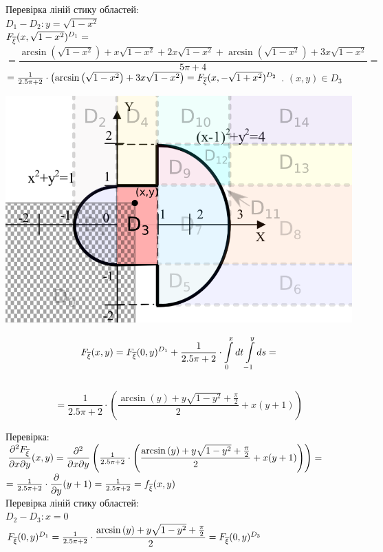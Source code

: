 \documentclass[14pt,a4paper]{scrartcl}
\theoremstyle{definition}
\theoremstyle{remark}
\theoremstyle{definition}
\theoremstyle{definition}
\begin{document}
Перевірка ліній стику областей:\\
$D_1 - D_2: y = \sqrt{1- x^2}$\\
$ F_{\overline{\xi}} (x,\sqrt{1- x^2})^{D_1} = $\\
$=\dfrac{\arcsin\left(\sqrt{1-x^2}\right)+x\sqrt{1-x^2}+2x\sqrt{1-x^2}+\arcsin\left(\sqrt{1-x^2}\right)+3x\sqrt{1-x^2}}{5\pi + 4} =$
\\$= \frac{1}{2.5\pi + 2} \cdot \left( \arcsin\left(\sqrt{1-x^2}\right)+3x\sqrt{1-x^2} \right)  =F_{\overline{\xi}} (x,-\sqrt{1+x^2})^{D_2}$
. $(x,y) \in D_3$
\begin{center} \includegraphics[scale=0.4]{assets/zone43.png} \end{center}
$$
F_{\overline{\xi}} (x,y) =  F_{\overline{\xi}} (0,y)^{D_1}+ \frac{1}{2.5\pi + 2} \cdot  \int\limits_{0}^{ x}{dt  \int\limits_{-1}^{y }{ds}} =$$\\$$= \frac{1}{2.5\pi + 2} \cdot \left( \dfrac{\arcsin\left(y\right)+y\sqrt{1-y^2} + \frac{\pi}{2} }{2}+ x(y+1)\right)
$$

Перевірка:\\
$\dfrac{\partial^2 F_{\overline{\xi}}}{\partial x \partial y}(x,y) = \dfrac{\partial^2}{\partial x \partial y} \left(\frac{1}{2.5\pi + 2} \cdot \left( \dfrac{\arcsin\left(y\right)+y\sqrt{1-y^2} + \frac{\pi}{2} }{2}+ x(y+1)\right) \right) =$\\
$ = \frac{1}{2.5\pi + 2} \cdot \dfrac{\partial}{\partial y} (y+1) = \frac{1}{2.5\pi + 2} =f_{\overline{\xi}} (x,y)$\\

Перевірка ліній стику областей:\\
$D_2 - D_3: x = 0$\\
$ F_{\overline{\xi}} (0,y)^{D_1} =\frac{1}{2.5\pi + 2} \cdot\dfrac{\arcsin\left(y\right)+y\sqrt{1-y^2} + \frac{\pi}{2} }{2} =F_{\overline{\xi}} (0,y)^{D_3}$
\end{document}
